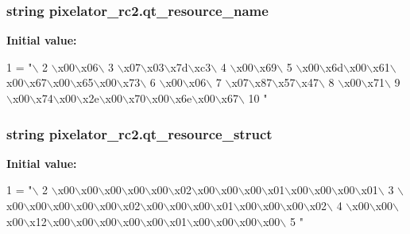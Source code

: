 \subsubsection[{qt\+\_\+resource\+\_\+name}]{\setlength{\rightskip}{0pt plus 5cm}string pixelator\+\_\+rc2.\+qt\+\_\+resource\+\_\+name}\label{namespacepixelator__rc2_acfeae540fdc30e6660c687ee8556e46f}
{\bfseries Initial value\+:}
\begin{DoxyCode}
1 = \textcolor{stringliteral}{"\(\backslash\)}
2 \textcolor{stringliteral}{\(\backslash\)x00\(\backslash\)x06\(\backslash\)}
3 \textcolor{stringliteral}{\(\backslash\)x07\(\backslash\)x03\(\backslash\)x7d\(\backslash\)xc3\(\backslash\)}
4 \textcolor{stringliteral}{\(\backslash\)x00\(\backslash\)x69\(\backslash\)}
5 \textcolor{stringliteral}{\(\backslash\)x00\(\backslash\)x6d\(\backslash\)x00\(\backslash\)x61\(\backslash\)x00\(\backslash\)x67\(\backslash\)x00\(\backslash\)x65\(\backslash\)x00\(\backslash\)x73\(\backslash\)}
6 \textcolor{stringliteral}{\(\backslash\)x00\(\backslash\)x06\(\backslash\)}
7 \textcolor{stringliteral}{\(\backslash\)x07\(\backslash\)x87\(\backslash\)x57\(\backslash\)x47\(\backslash\)}
8 \textcolor{stringliteral}{\(\backslash\)x00\(\backslash\)x71\(\backslash\)}
9 \textcolor{stringliteral}{\(\backslash\)x00\(\backslash\)x74\(\backslash\)x00\(\backslash\)x2e\(\backslash\)x00\(\backslash\)x70\(\backslash\)x00\(\backslash\)x6e\(\backslash\)x00\(\backslash\)x67\(\backslash\)}
10 \textcolor{stringliteral}{"}
\end{DoxyCode}
\hypertarget{namespacepixelator__rc2_a6fd5bd0fd3381bd2834317b10c2ca3e9}{}
\subsubsection[{qt\+\_\+resource\+\_\+struct}]{\setlength{\rightskip}{0pt plus 5cm}string pixelator\+\_\+rc2.\+qt\+\_\+resource\+\_\+struct}\label{namespacepixelator__rc2_a6fd5bd0fd3381bd2834317b10c2ca3e9}
{\bfseries Initial value\+:}
\begin{DoxyCode}
1 = \textcolor{stringliteral}{"\(\backslash\)}
2 \textcolor{stringliteral}{\(\backslash\)x00\(\backslash\)x00\(\backslash\)x00\(\backslash\)x00\(\backslash\)x00\(\backslash\)x02\(\backslash\)x00\(\backslash\)x00\(\backslash\)x00\(\backslash\)x01\(\backslash\)x00\(\backslash\)x00\(\backslash\)x00\(\backslash\)x01\(\backslash\)}
3 \textcolor{stringliteral}{\(\backslash\)x00\(\backslash\)x00\(\backslash\)x00\(\backslash\)x00\(\backslash\)x00\(\backslash\)x02\(\backslash\)x00\(\backslash\)x00\(\backslash\)x00\(\backslash\)x01\(\backslash\)x00\(\backslash\)x00\(\backslash\)x00\(\backslash\)x02\(\backslash\)}
4 \textcolor{stringliteral}{\(\backslash\)x00\(\backslash\)x00\(\backslash\)x00\(\backslash\)x12\(\backslash\)x00\(\backslash\)x00\(\backslash\)x00\(\backslash\)x00\(\backslash\)x00\(\backslash\)x01\(\backslash\)x00\(\backslash\)x00\(\backslash\)x00\(\backslash\)x00\(\backslash\)}
5 \textcolor{stringliteral}{"}
\end{DoxyCode}
